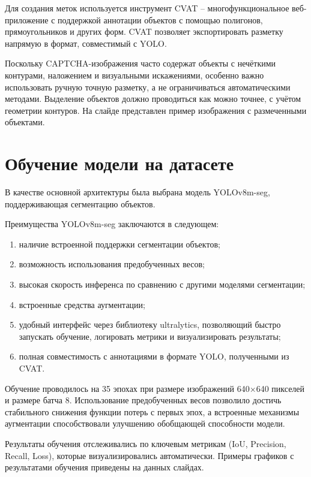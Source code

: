 \documentclass{altsu-report}
\begin{document}
Для создания меток используется инструмент CVAT -- многофункциональное веб-приложение с поддержкой аннотации объектов с помощью полигонов, прямоугольников и других форм. CVAT позволяет экспортировать разметку напрямую в формат, совместимый с YOLO.

Поскольку CAPTCHA-изображения часто содержат объекты с нечёткими контурами, наложением и визуальными искажениями, особенно важно использовать ручную точную разметку, а не ограничиваться автоматическими методами. Выделение объектов должно проводиться как можно точнее, с учётом геометрии контуров. На слайде представлен пример изображения с размеченными объектами.

\section*{Обучение модели на датасете}

В качестве основной архитектуры была выбрана модель YOLOv8m-seg, поддерживающая сегментацию объектов.

Преимущества YOLOv8m-seg заключаются в следующем:

\begin{enumerate}
    \item наличие встроенной поддержки сегментации объектов;
    \item возможность использования предобученных весов;
    \item высокая скорость инференса по сравнению с другими моделями сегментации;
    \item встроенные средства аугментации;
    \item удобный интерфейс через библиотеку ultralytics, позволяющий быстро запускать обучение, логировать метрики и визуализировать результаты;
    \item полная совместимость с аннотациями в формате YOLO, полученными из CVAT.
\end{enumerate}

Обучение проводилось на 35 эпохах при размере изображений 640×640 пикселей и размере батча 8. Использование предобученных весов позволило достичь стабильного снижения функции потерь с первых эпох, а встроенные механизмы аугментации способствовали улучшению обобщающей способности модели.

Результаты обучения отслеживались по ключевым метрикам (IoU, Precision, Recall, Loss), которые визуализировались автоматически. Примеры графиков с результатами обучения приведены на данных слайдах.
\end{document}
